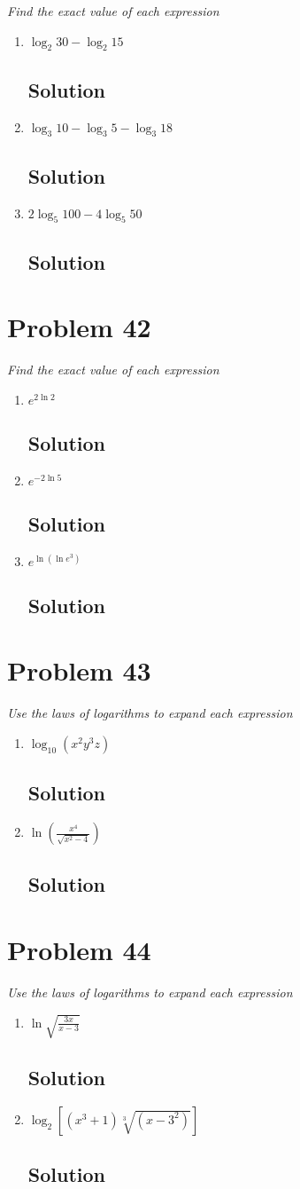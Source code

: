 \documentclass[11pt]{article}
\newcommand{\soln}{\subsection*}
\newcommand{\qn}{\textit}
\begin{document}
\qn{Find the exact value of each expression}
\begin{enumerate}
	\item \qn{$\log_2{30}-\log_2{15}$}
	\soln{Solution}
	
	\item \qn{$\log_3{10}-\log_3{5}-\log_3{18}$}
	\soln{Solution}
	
	\item \qn{$2\log_5{100}-4\log_5{50}$}
	\soln{Solution}
\end{enumerate}

\section*{Problem 42}

\qn{Find the exact value of each expression}
\begin{enumerate}
	\item \qn{$e^{2\ln2}$}
	\soln{Solution}
	
	\item \qn{$e^{-2\ln5}$}
	\soln{Solution}
	
	\item \qn{$e^{\ln(\ln{e^3})}$}
	\soln{Solution}
\end{enumerate}

\section*{Problem 43}

\qn{Use the laws of logarithms to expand each expression}
\begin{enumerate}
	\item \qn{$\log_{10}(x^2y^3z)$}
	\soln{Solution}
	
	\item \qn{$\ln(\frac{x^4}{\sqrt{x^2-4}})$}
	\soln{Solution}
\end{enumerate}

\section*{Problem 44}

\qn{Use the laws of logarithms to expand each expression}
\begin{enumerate}
	\item \qn{$\ln\sqrt{\frac{3x}{x-3}}$}
	\soln{Solution}
	
	\item \qn{$\log_2[(x^3+1)\sqrt[3]{(x-3^2)}]$}
	\soln{Solution}
\end{enumerate}
\end{document}
